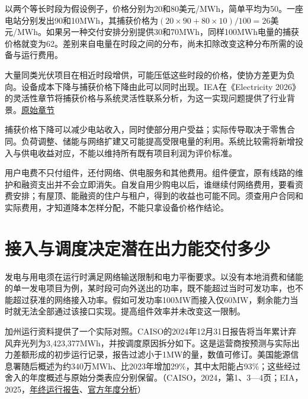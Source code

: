 \documentclass[UTF8,fontset=windows,12pt,a4paper,oneside,openany]{ctexbook}
\begin{document}
以两个等长时段为假设例子，价格分别为20和80美元/MWh，简单平均为50。一座电站分别发出90和10MWh，其捕获价格为\((20\times90+80\times10)/100=26\)美元/MWh。如果另一种交付安排分别提供30和70MWh，同样100MWh电量的捕获价格就变为62。差别来自电量在时段之间的分布，尚未扣除改变这种分布所需的设备与运行费用。

大量同类光伏项目在相近时段增供，可能压低这些时段的价格，使协方差更为负向。设备成本下降与捕获价格下降由此可以同时出现。IEA在《Electricity 2026》的灵活性章节将捕获价格与系统灵活性联系分析，为这一实现问题提供了行业背景。\href{https://www.iea.org/reports/electricity-2026/flexibility}{原始章节}

捕获价格下降可以减少电站收入，同时使部分用户受益；实际传导取决于零售合同。负荷调整、储能与网络扩建又可能提高受限电量的利用。系统比较需将新增投入与供电收益对应，不能以维持所有既有项目利润为评价标准。

用户电费不只付组件，还付网络、供电服务和其他费用。组件便宜，原有线路的维护和融资支出并不会立即消失。自发自用少购电以后，谁继续付网络费用，要看资费安排；有屋顶、能融资的住户与租户，得到的收益也可能不同。须查用户合同和实际费用，才知道降本怎样分配，不能只拿设备价格作结论。

\section{接入与调度决定潜在出力能交付多少}

发电与用电须在运行时满足网络输送限制和电力平衡要求。以没有本地消费和储能的单一发电项目为例，某时段可向外送出的功率，既不能超过当时可发功率，也不能超过获准的网络接入功率。假如可发功率100MW而接入仅60MW，剩余能力当时就无法全部通过该接口实现。提高组件效率并未改变这一限制。

加州运行资料提供了一个实际对照。CAISO的2024年12月31日报告将当年累计弃风弃光列为3,423,377MWh，并按调度原因拆分如下。这是运营商按预测与实际出力差额形成的初步运行记录，报告过滤小于1MW的量，数值可修订。美国能源信息署随后概述为约340万MWh、比2023年增加29\%，其中太阳能占93\%；这些经过舍入的年度概述与原始分类表应分别保留。（CAISO，2024，第1、3—4页；EIA，2025，\href{https://www.caiso.com/documents/wind-solar-real-time-dispatch-curtailment-report-dec-31-2024.pdf}{年终运行报告}、\href{https://www.eia.gov/todayinenergy/detail.php?id=65364}{官方年度分析}）
\end{document}
